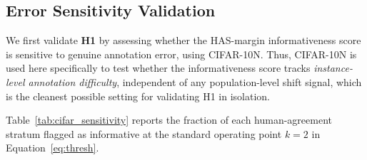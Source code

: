 

\subsection{Error Sensitivity Validation}
\label{sec:res_cifar}
We first validate \textbf{H1} by assessing whether the HAS-margin
informativeness score is sensitive to genuine annotation error, using
CIFAR-10N. 
Thus, CIFAR-10N is used here specifically to test whether the informativeness score tracks
\emph{instance-level annotation difficulty}, independent of any
population-level shift signal, which is the cleanest possible setting for
validating H1 in isolation.

Table~\ref{tab:cifar_sensitivity} reports the fraction of each
human-agreement stratum flagged as informative at the standard operating
point $k=2$ in Equation~\ref{eq:thresh}.

